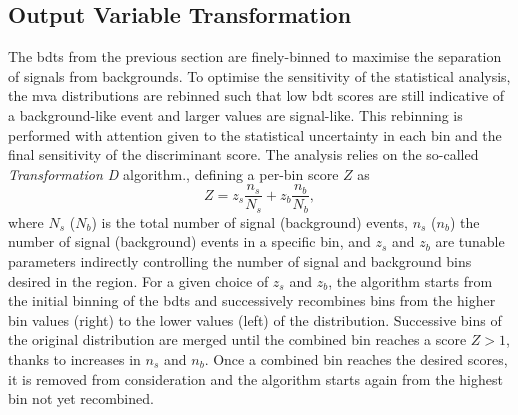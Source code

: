 \subsection{Output Variable Transformation}
The \glspl{bdt} from the previous section are finely-binned to maximise the separation of signals from backgrounds. To optimise the sensitivity of the statistical analysis, the \gls{mva} distributions are rebinned such that low \gls{bdt} scores are still indicative of a background-like event and larger values are signal-like. This rebinning is performed with attention given to the statistical uncertainty in each bin and the final sensitivity of the discriminant score. The analysis relies on the so-called \textit{Transformation D} algorithm., defining a per-bin score $Z$ as
\begin{equation}
    Z = z_s \frac{n_s}{N_s} + z_b \frac{n_b}{N_b},
\end{equation} 
where $N_s$ ($N_b$) is the total number of signal (background) events, $n_s$ ($n_b$) the number of signal (background) events in a specific bin, and $z_s$ and $z_b$ are tunable parameters indirectly controlling the number of signal and background bins desired in the region. For a given choice of $z_s$ and $z_b$, the algorithm starts from the initial binning of the \glspl{bdt} and successively recombines bins from the higher bin values (right) to the lower values (left) of the distribution. Successive bins of the original distribution are merged until the combined bin reaches a score $Z > 1$, thanks to increases in $n_s$ and $n_b$. Once a combined bin reaches the desired scores, it is removed from consideration and the algorithm starts again from the highest bin not yet recombined.\\
